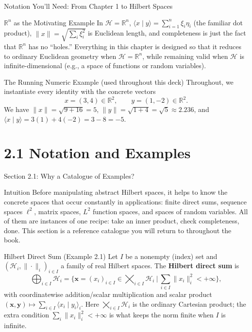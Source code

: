 \documentclass[aspectratio=169,10pt]{beamer}
\newcommand{\R}{\mathbb{R}}
\newcommand{\Hil}{\mathcal{H}}
\newcommand{\ip}[2]{\langle #1 \mid #2 \rangle}
\begin{document}
\begin{frame}[allowframebreaks]{Notation You'll Need: From Chapter 1 to Hilbert Spaces}
  \begin{exampleblock}{$\R^n$ as the Motivating Example}
    In $\Hil = \R^n$, $\ip{x}{y} = \sum_{i=1}^n \xi_i \eta_i$ (the familiar dot
    product), $\|x\| = \sqrt{\sum_i \xi_i^2}$ is Euclidean length, and
    completeness is just the fact that $\R^n$ has no ``holes.'' Everything in
    this chapter is designed so that it reduces to ordinary Euclidean
    geometry when $\Hil = \R^n$, while remaining valid when $\Hil$ is
    infinite-dimensional (e.g., a space of functions or random variables).
  \end{exampleblock}

  \begin{alertblock}{The Running Numeric Example (used throughout this deck)}
    Throughout, we instantiate every identity with the concrete vectors
    \[
      x = (3, 4) \in \R^2, \qquad y = (1, -2) \in \R^2.
    \]
    We have $\|x\| = \sqrt{9+16} = 5$, $\|y\| = \sqrt{1+4} = \sqrt{5} \approx
    2.236$, and $\ip{x}{y} = 3(1) + 4(-2) = 3 - 8 = -5$.
  \end{alertblock}

\end{frame}

\section{2.1 Notation and Examples}

\begin{frame}{Section 2.1: Why a Catalogue of Examples?}
  \begin{block}{Intuition}
    Before manipulating abstract Hilbert spaces, it helps to know the
    concrete spaces that occur constantly in applications: finite direct
    sums, sequence spaces $\ell^2$, matrix spaces, $L^2$ function spaces, and
    spaces of random variables. All of them are instances of one recipe:
    take an inner product, check completeness, done. This section is a
    reference catalogue you will return to throughout the book.
  \end{block}

  \begin{block}{Hilbert Direct Sum (Example 2.1)}
    Let $I$ be a nonempty (index) set and $(\Hil_i, \|\cdot\|_i)_{i \in I}$ a
    family of real Hilbert spaces. The \textbf{Hilbert direct sum} is
    \[
      \bigoplus_{i \in I} \Hil_i = \Big\{ \bm{x} = (x_i)_{i\in I} \in
      \bigtimes_{i \in I} \Hil_i \ \Big|\ \sum_{i \in I} \|x_i\|_i^2 < +\infty
      \Big\},
    \]
    with coordinatewise addition/scalar multiplication and scalar product
    $(\bm{x}, \bm{y}) \mapsto \sum_{i \in I} \ip{x_i}{y_i}_i$. Here
    $\bigtimes_{i\in I}\Hil_i$ is the ordinary Cartesian product; the extra
    condition $\sum_i \|x_i\|_i^2 < +\infty$ is what keeps the norm finite
    when $I$ is infinite.
  \end{block}
\end{frame}
\end{document}

